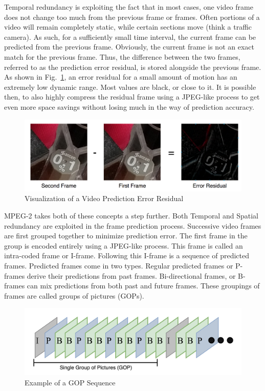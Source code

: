 Temporal redundancy is exploiting the fact that in most cases, one video frame does not change too much from the previous frame or frames. Often portions of a video will remain completely static, while certain sections move (think a traffic camera). As such, for a sufficiently small time interval, the current frame can be predicted from the previous frame. Obviously, the current frame is not an exact match for the previous frame. Thus, the difference between the two frames, referred to as the prediction error residual, is stored alongside the previous frame. As shown in Fig.~\ref{residualvis}, an error residual for a small amount of motion has an extremely low dynamic range. Most values are black, or close to it. It is possible then, to also highly compress the residual frame using a JPEG-like process to get even more space savings without losing much in the way of prediction accuracy.

\begin{figure}[htbp]
\centerline{\includegraphics[width=0.9\linewidth]{Background/error_residual_vis.png}}
\caption{Visualization of a Video Prediction Error Residual}
\label{residualvis}
\end{figure}

MPEG-2 takes both of these concepts a step further. Both Temporal and Spatial redundancy are exploited in the frame prediction process. Successive video frames are first grouped together to minimize prediction error. The first frame in the group is encoded entirely using a JPEG-like process. This frame is called an intra-coded frame or I-frame. Following this I-frame is a sequence of predicted frames. Predicted frames come in two types. Regular predicted frames or P-frames derive their predictions from past frames. Bi-directional frames, or B-frames can mix predictions from both past and future frames. These groupings of frames are called groups of pictures (GOPs).

\begin{figure}[htbp]
\centerline{\includegraphics[width=0.9\linewidth]{Background/gop_example.png}}
\caption{Example of a GOP Sequence}
\label{exampleGOP}
\end{figure}

